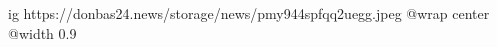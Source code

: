  
 
 
 
 

\ifcmt
  ig https://donbas24.news/storage/news/pmy944spfqq2uegg.jpeg
  @wrap center
  @width 0.9
\fi
